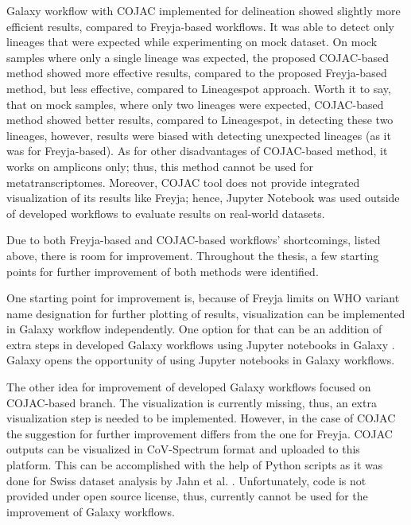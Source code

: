 Galaxy workflow with COJAC implemented for delineation showed slightly more efficient results, compared to Freyja-based workflows. It was able to detect only lineages that were expected while experimenting on mock dataset. On mock samples where only a single lineage was expected, the proposed COJAC-based method showed more effective results, compared to the proposed Freyja-based method, but less effective, compared to Lineagespot approach. Worth it to say, that on mock samples, where only two lineages were expected, COJAC-based method showed better results, compared to Lineagespot, in detecting these two lineages, however, results were biased with detecting unexpected lineages (as it was for Freyja-based). As for other disadvantages of COJAC-based method, it works on amplicons only; thus, this method cannot be used for metatranscriptomes. Moreover, COJAC tool does not provide integrated visualization of its results like Freyja; hence, Jupyter Notebook was used outside of developed workflows to evaluate results on real-world datasets.

Due to both Freyja-based and COJAC-based workflows' shortcomings, listed above, there is room for improvement. Throughout the thesis, a few starting points for further improvement of both methods were identified.

One starting point for improvement is, because of Freyja limits on WHO variant name designation for further plotting of results, visualization can be implemented in Galaxy workflow independently. One option for that can be an addition of extra steps in developed Galaxy workflows using Jupyter notebooks in Galaxy \cite{galaxyjupyter,batut2018}. Galaxy opens the opportunity of using Jupyter notebooks in Galaxy workflows. 

The other idea for improvement of developed Galaxy workflows focused on COJAC-based branch. The visualization is currently missing, thus, an extra visualization step is needed to be implemented. However, in the case of COJAC the suggestion for further improvement differs from the one for Freyja. COJAC outputs can be visualized in CoV-Spectrum \cite{chen2022b} format and uploaded to this platform. This can be accomplished with the help of Python scripts as it was done for Swiss dataset analysis by Jahn et al. \cite{jahn2022,swisscovspectrum}. Unfortunately, code is not provided under open source license, thus, currently cannot be used for the improvement of Galaxy workflows. 

